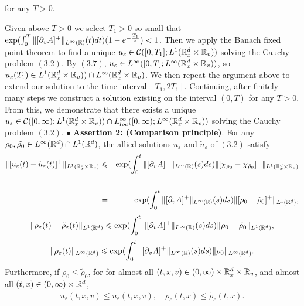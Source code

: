 \documentclass[11pt]{article}
\begin{document}
for any $T>0$.
 \vskip1mm\par
Given above $T>0$ we select $T_1>0$ so small that
$\exp(\int^T_0\|[\partial_vA]^+\|_{L^\infty({\mathbb R})}(t)dt)
(1-e^{-\frac{T_1}{\varepsilon}})<1$. Then we apply the Banach fixed
point theorem to find a unique $u_\varepsilon \in
{\mathcal C}([0,T_1];L^1({\mathbb R}^d_x\times{\mathbb R}_v))$ solving the Cauchy problem
$(3.2)$. By $(3.7)$, $u_\varepsilon \in
L^\infty([0,T];L^\infty({\mathbb R}^d_x\times{\mathbb R}_v))$, so
$u_\varepsilon(T_1)\in L^1({\mathbb R}^d_x\times{\mathbb R}_v))\cap
L^\infty({\mathbb R}^d_x\times{\mathbb R}_v)$. We then repeat the argument above to
extend our solution to the time interval $[T_1,2T_1]$. Continuing,
after finitely many steps we construct a solution existing on the
interval $(0,T)$ for any $T>0$. From this, we demonstrate that there
exists a unique $u_\varepsilon \in
{\mathcal C}([0,\infty);L^1({\mathbb R}^d_x\times{\mathbb R}_v))\cap
L^\infty_{loc}([0,\infty);L^\infty({\mathbb R}^d_x\times{\mathbb R}_v))$ solving the
Cauchy problem $(3.2)$.
 \vskip2mm\noindent
$\bullet$ \textbf{Assertion 2: (Comparison principle)}. For any
$\rho_0,\tilde{\rho_0}\in  L^\infty({\mathbb R}^d)\cap L^1({\mathbb R}^d)$, the
allied solutions $u_\varepsilon$ and $\tilde{u}_\varepsilon$ of
$(3.2)$ satisfy
\begin{eqnarray}\label{3.10}
\|[u_\varepsilon(t)-\tilde{u}_\varepsilon(t)]^+\|_{L^1({\mathbb R}^d_x\times
{\mathbb R}_v)} &\leqslant&
\exp(\int^t_0\|[\partial_vA]^+\|_{L^\infty({\mathbb R})}(s)ds)\|[\chi_{\rho_0}-\chi_{\tilde{\rho}_0}]^+\|_{L^1({\mathbb R}^d_x\times
{\mathbb R}_v)} \cr\cr&=&
\exp(\int^t_0\|[\partial_vA]^+\|_{L^\infty({\mathbb R})}(s)ds)
\|[\rho_0-\tilde{\rho}_0]^+\|_{L^1({\mathbb R}^d)},
\end{eqnarray}
\begin{eqnarray}\label{3.11}
\|\rho_\varepsilon(t)-\tilde{\rho}_\varepsilon(t)\|_{L^1({\mathbb R}^d)}\leqslant
\exp(\int^t_0\|[\partial_vA]^+\|_{L^\infty({\mathbb R})}(s)ds)
\|\rho_0-\tilde{\rho}_0\|_{L^1({\mathbb R}^d)},
\end{eqnarray}
\begin{eqnarray}\label{3.12}
\|\rho_\varepsilon(t)\|_{L^\infty({\mathbb R}^d)}\leqslant
\exp(\int^t_0\|[\partial_vA]^+\|_{L^\infty({\mathbb R})}(s)ds)
\|\rho_0\|_{L^\infty({\mathbb R}^d)}.
\end{eqnarray}
Furthermore, if $\rho_0\leq \tilde{\rho}_0$, for for almost all
$(t,x,v)\in (0,\infty)\times {\mathbb R}^d_x\times {\mathbb R}_v$, and almost all
$(t,x)\in (0,\infty)\times {\mathbb R}^d$,
\begin{eqnarray}\label{3.13}
u_\varepsilon(t,x,v)\leq\tilde{u}_\varepsilon(t,x,v),\quad
\rho_\varepsilon(t,x)\leq \tilde{\rho}_\varepsilon(t,x).
\end{eqnarray}
 \vskip1mm\par
\end{document}
